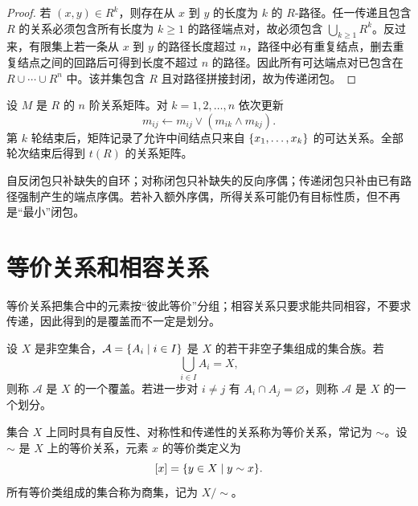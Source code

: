 \begin{proof}
若 $(x,y)\in R^k$，则存在从 $x$ 到 $y$ 的长度为 $k$ 的 $R$-路径。任一传递且包含 $R$ 的关系必须包含所有长度为 $k\ge1$ 的路径端点对，故必须包含 $\bigcup_{k\ge1}R^k$。反过来，有限集上若一条从 $x$ 到 $y$ 的路径长度超过 $n$，路径中必有重复结点，删去重复结点之间的回路后可得到长度不超过 $n$ 的路径。因此所有可达端点对已包含在 $R\cup\cdots\cup R^n$ 中。该并集包含 $R$ 且对路径拼接封闭，故为传递闭包。
\end{proof}

\begin{method}\label{ch2-warshall}
设 $M$ 是 $R$ 的 $n$ 阶关系矩阵。对 $k=1,2,\ldots,n$ 依次更新
\[
  m_{ij}\leftarrow m_{ij}\vee(m_{ik}\wedge m_{kj}).
\]
第 $k$ 轮结束后，矩阵记录了允许中间结点只来自 $\{x_1,\ldots,x_k\}$ 的可达关系。全部轮次结束后得到 $t(R)$ 的关系矩阵。
\end{method}

\begin{pitfall}[闭包不是随意补边]\label{ch2-closure-pitfall}
自反闭包只补缺失的自环；对称闭包只补缺失的反向序偶；传递闭包只补由已有路径强制产生的端点序偶。若补入额外序偶，所得关系可能仍有目标性质，但不再是“最小”闭包。
\end{pitfall}

\section{等价关系和相容关系}

等价关系把集合中的元素按“彼此等价”分组；相容关系只要求能共同相容，不要求传递，因此得到的是覆盖而不一定是划分。

\begin{definition}[覆盖与划分]\label{ch2-cover-partition}
设 $X$ 是非空集合，$\mathcal A=\{A_i\mid i\in I\}$ 是 $X$ 的若干非空子集组成的集合族。若
\[
  \bigcup_{i\in I}A_i=X,
\]
则称 $\mathcal A$ 是 $X$ 的一个覆盖。若进一步对 $i\ne j$ 有 $A_i\cap A_j=\varnothing$，则称 $\mathcal A$ 是 $X$ 的一个划分。
\end{definition}

\begin{definition}[等价关系与等价类]\label{ch2-equivalence}
集合 $X$ 上同时具有自反性、对称性和传递性的关系称为等价关系，常记为 $\sim$。设 $\sim$ 是 $X$ 上的等价关系，元素 $x$ 的等价类定义为
\[
  [x]=\{y\in X\mid y\sim x\}.
\]
所有等价类组成的集合称为商集，记为 $X/{\sim}$。
\end{definition}


